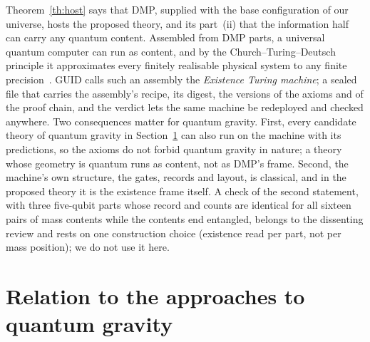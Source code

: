 \documentclass[11pt,a4paper]{article}
\theoremstyle{definition}
\theoremstyle{remark}
\theoremstyle{definition}
\begin{document}
Theorem~\ref{th:host} says that DMP, supplied with the base configuration of our universe, hosts the proposed theory, and its part~(ii)
that the information half can carry any quantum content. Assembled from DMP parts, a universal quantum computer
can run as content, and by the Church--Turing--Deutsch principle it approximates every finitely realisable physical system to any finite
precision~\cite{deutsch}. GUID calls such an assembly the \emph{Existence Turing machine}; a sealed file that carries the assembly's
recipe, its digest, the versions of the axioms and of the proof chain, and the verdict lets the same machine be redeployed and checked
anywhere. Two consequences matter for quantum gravity. First, every candidate theory of quantum gravity in Section~\ref{sec:landscape} can
also run on the machine with its predictions, so the axioms do not forbid quantum gravity in nature; a theory whose geometry is quantum runs
as content, not as DMP's frame. Second, the machine's own structure, the gates, records and layout, is classical, and in the proposed theory
it is the existence frame itself. A
check of the second statement, with three five-qubit parts whose record and counts are identical for all sixteen pairs of mass contents
while the contents end entangled, belongs to the dissenting review and rests on one construction choice (existence read per part, not per
mass position); we do not use it here.

\section{Relation to the approaches to quantum gravity}\label{sec:landscape}
\end{document}

